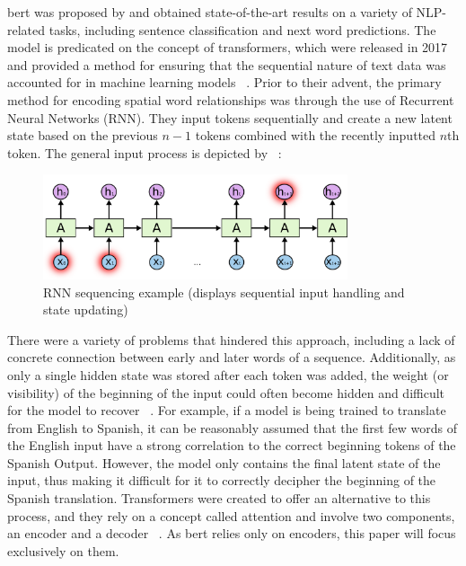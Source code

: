 \acrshort{bert} was proposed by \textcite{devlin2019bert:} and obtained state-of-the-art results on a variety of NLP-related tasks, including sentence classification and next word predictions. The model is predicated on the concept of transformers, which were released in 2017 and provided a method for ensuring that the sequential nature of text data was accounted for in machine learning models ~\parencite{transformers:}. Prior to their advent, the primary method for encoding spatial word relationships was through the use of Recurrent Neural Networks (RNN). They input tokens sequentially and create a new latent state based on the previous $n-1$ tokens combined with the recently inputted $n$th token. The general input process is depicted by ~\textcite{olah_2015}:

\begin{figure}[h]
\centering
\includegraphics[width=0.8\textwidth]{fig/rnn.png}
\caption{RNN sequencing example (displays sequential input handling and state updating)
}
\label{fig:rnn}
\end{figure}

There were a variety of problems that hindered this approach, including a lack of concrete connection between early and later words of a sequence. Additionally, as only a single hidden state was stored after each token was added, the weight (or visibility) of the beginning of the input could often become hidden and difficult for the model to recover ~\parencite{hochreiter1997long}. 
For example, if a model is being trained to translate from English to Spanish, it can be reasonably assumed that the first few words of the English input have a strong correlation to the correct beginning tokens of the Spanish Output. However, the model only contains the final latent state of the input, thus making it difficult for it to correctly decipher the beginning of the Spanish translation. Transformers were created to offer an alternative to this process, and they rely on a concept called attention and involve two components, an encoder and a decoder ~\parencite{transformers:}. As \acrshort{bert} relies only on encoders, this paper will focus exclusively on them.

